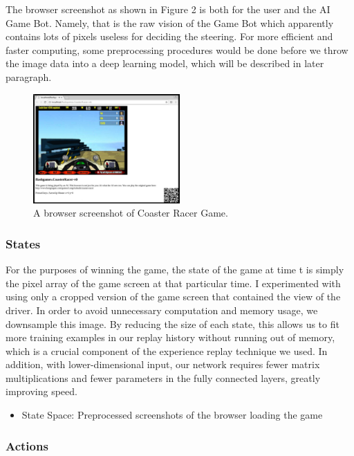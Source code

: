 \documentclass[a4paper]{article}
\begin{document}
The browser screenshot as shown in Figure 2 is both for the user and the AI Game Bot. Namely, that is the raw vision of the Game Bot which apparently contains lots of pixels useless for deciding the steering. For more efficient and faster computing, some preprocessing procedures would be done before we throw the image data into a deep learning model, which will be described in later paragraph.

\begin{figure}[h]
\centering
\includegraphics[width=0.5\textwidth]{raw-vision-of-game}
\caption{A browser screenshot of Coaster Racer Game.}
\end{figure}

\subsubsection{States}

For the purposes of winning the game, the state of the game at time t is simply the pixel array of the game screen at that particular time. I experimented with using only a cropped version of the game screen that contained the view of the driver. In order to avoid unnecessary computation and memory usage, we downsample this image. By reducing the size of each state, this allows us to fit more training examples in our replay history without running out of memory, which is a crucial component of the experience replay technique we used. In addition, with lower-dimensional input, our network requires fewer matrix multiplications and fewer parameters in the fully connected layers, greatly improving speed.

\begin{itemize}
		
	\item State Space: {Preprocessed screenshots of the browser loading the game}

\end{itemize}

\subsubsection{Actions}
\end{document}
